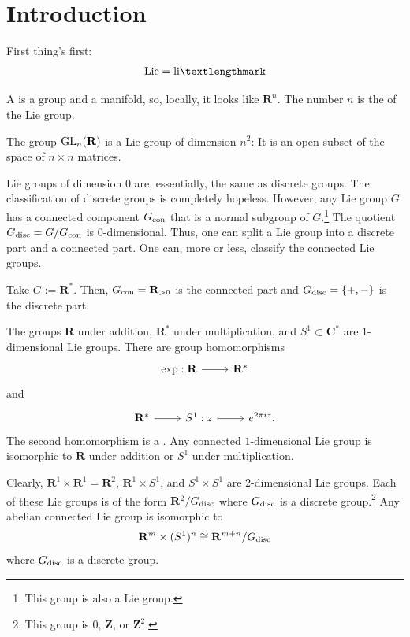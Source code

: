 \documentclass [11 pt, oneside] {article}
\begin{document}
\section {Introduction}
First thing's first:
\begin{align*}
	\textrm{Lie} = \textrm{li\textlengthmark}
\end{align*}

A  is a group and a manifold, so, locally, it looks like $\mathbf{R}^{n}$. The number $n$ is the  of the Lie group.

The group $\operatorname{GL}_{n}(\mathbf{R})$ is a Lie group of dimension $n^{2}$: It is an open subset of the space of $n\times n$ matrices. 

Lie groups of dimension $0$ are, essentially, the same as discrete groups.
The classification of discrete groups is completely hopeless.
However, any Lie group $G$ has a connected component $G_{\textup {con}}$ that is a normal subgroup of $G$.\footnote{This group is also a Lie group.}
The quotient $G_{\textup {disc}} = G/G_{\textup {con}}$ is $0$-dimensional.
Thus, one can split a Lie group into a discrete part and a connected part. One can, more or less, classify the connected Lie groups.

\begin{example}[ ]\label{}\text{}
Take $G:= \mathbf{R}^{*}$. 
Then, $G_{\textup {con}} = \mathbf{R}_{>0}$ is the connected part and $G_{\textup {disc}} = \{+,-\}$ is the discrete part.
\end{example}

The groups $\mathbf{R}$ under addition, $\mathbf{R}^{*}$ under multiplication, and $S^{1}\subset \mathbf{C}^{*}$ are $1$-dimensional Lie groups.
There are group homomorphisms
\[
\begin{tikzcd}
	\exp:\mathbf{R}\ar[r] & \mathbf{R}^{*}
\end{tikzcd}
\]
and
\[
\begin{tikzcd}
	\mathbf{R}^{*}\ar[r] & S^{1} : z\ar[r,mapsto] & e^{2\pi i z}.
\end{tikzcd}
\]
The second homomorphism is a .
Any connected $1$-dimensional Lie group is isomorphic to $\mathbf{R}$ under addition or $S^{1}$ under multiplication.

Clearly, $\mathbf{R}^{1}\times \mathbf{R}^{1} = \mathbf{R}^{2}$, $\mathbf{R}^{1}\times S^{1}$, and $S^{1}\times S^{1}$ are $2$-dimensional Lie groups. 
Each of these Lie groups is of the form $\mathbf{R}^{2}/G_{\textup {disc}}$ where $G_{\textup {disc}}$ is a discrete group.\footnote{This group is $0$, $\mathbf{Z}$, or $\mathbf{Z}^{2}$.}
Any abelian connected Lie group is isomorphic to
\begin{align*}
	\mathbf{R}^{m} \times (S^{1}) ^{n} \cong \mathbf{R}^{m+n}/G_{\textup {disc}}
\end{align*}
where $G_{\textup {disc}}$ is a discrete group.
\end{document}

